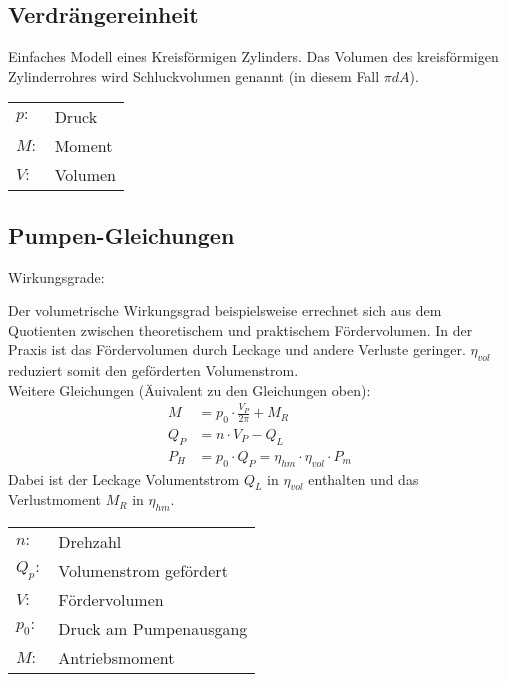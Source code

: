 \subsection{Verdrängereinheit}
Einfaches Modell eines Kreisförmigen Zylinders. Das Volumen des kreisförmigen Zylinderrohres wird Schluckvolumen genannt (in diesem Fall $\pi  d  A$). 
\begin{tabular}{ll}
$p:$ & Druck \\
$M:$ & Moment \\
$V:$ & Volumen
\end{tabular}


\vfill
\columnbreak
\subsection{Pumpen-Gleichungen}
Wirkungsgrade:

Der volumetrische Wirkungsgrad beispielsweise errechnet sich aus dem Quotienten zwischen theoretischem und praktischem Fördervolumen. In der Praxis ist das Fördervolumen durch Leckage und andere Verluste geringer. $\eta_{vol}$ reduziert somit den geförderten Volumenstrom. \\

Weitere Gleichungen (Äuivalent zu den Gleichungen oben):
\begin{align*}
M &= p_0 \cdot \frac{V_P}{2 \pi} + M_R \tag{Pumpenmoment} \\
Q_P &= n \cdot V_P - Q_L \tag{Volumenstrom} \\
P_H &= p_0 \cdot Q_P = \eta_{hm} \cdot \eta_{vol} \cdot P_m \tag{Leistung}
\end{align*}
Dabei ist der Leckage Volumentstrom $Q_L$ in $\eta_{vol}$ enthalten und das Verlustmoment $M_R$ in $\eta_{hm}$.

\begin{tabular}{ll}
$n:$ & Drehzahl \\
$Q_p:$ & Volumenstrom gefördert\\
$V:$ & Fördervolumen \\
$p_0:$ & Druck am Pumpenausgang \\
$M:$ & Antriebsmoment
\end{tabular}

